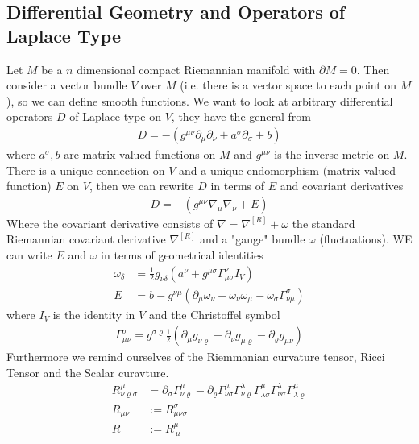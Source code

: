 \documentclass[a4paper]{article}
\theoremstyle{definition}
\theoremstyle{definition}
\theoremstyle{definition}
\theoremstyle{theorem}
\theoremstyle{theorem}
\theoremstyle{theorem}
\begin{document}
\subsection{Differential Geometry and Operators of Laplace Type}
Let $M$ be a $n$ dimensional compact Riemannian manifold with $\partial M = 0$.
Then consider a vector bundle $V$ over $M$ (i.e. there is a vector space to
each point on $M$), so we can define smooth functions. We want to look at
arbitrary differential operators $D$ of Laplace type on $V$, they have the general
from
\begin{align}
    D = -(g^{\mu\nu} \partial_\mu\partial_\nu + a^\sigma\partial_\sigma +b)
\end{align}
where $a^\sigma, b$ are matrix valued functions on $M$ and $g^{\mu\nu}$ is the
inverse metric on $M$. There is a unique connection on $V$ and a unique
endomorphism (matrix valued function) $E$ on $V$, then we can rewrite $D$ in
terms of $E$ and covariant derivatives
\begin{align}
    D = -(g^{\mu\nu} \nabla_\mu \nabla_\nu +E)
\end{align}
Where the covariant derivative consists of $\nabla = \nabla^{[R]} +\omega$ the
standard Riemannian covariant derivative $\nabla^{[R]}$ and a "gauge" bundle
$\omega$ (fluctuations). WE can write $E$ and $\omega$ in terms of geometrical
identities
\begin{align}
    \omega_\delta &= \frac{1}{2}g_{\nu\delta}(a^\nu
    +g^{\mu\sigma}\Gamma^\nu_{\mu\sigma}I_V)\\
    E &= b - g^{\nu\mu}(\partial_\mu \omega_\nu + \omega_\nu \omega_\mu -
    \omega_\sigma \Gamma^\sigma_{\nu\mu})
\end{align}
where $I_V$ is the identity in $V$ and the Christoffel symbol
\begin{align}
    \Gamma^\sigma_{\mu\nu} = g^{\sigma\varrho} \frac{1}{2} (\partial_\mu
    g_{\nu\varrho} + \partial_\nu g_{\mu\varrho} - \partial_\varrho g_{\mu\nu})
\end{align}
Furthermore we remind ourselves of the Riemmanian curvature tensor, Ricci
Tensor and the Scalar curavture.
\begin{align}
    R^\mu_{\nu\varrho\sigma} &= \partial_\sigma \Gamma^{\mu}_{\nu\varrho}
    -\partial_\varrho \Gamma^\mu_{\nu\sigma}
    \Gamma^{\lambda}_{\nu\varrho}\Gamma^{\mu}_{\lambda\sigma}
    \Gamma^{\lambda}_{\nu\sigma}\Gamma^{\mu}_{\lambda\varrho}\\
    R_{\mu\nu} &:= R^{\sigma}_{\mu\nu\sigma}\\
    R &:= R^\mu_{\ \mu}
\end{align}
\end{document}
